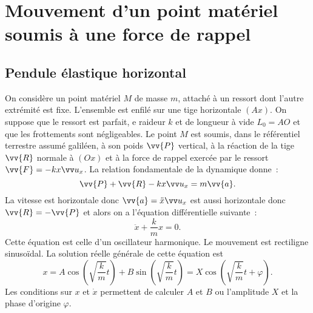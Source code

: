 \section{Mouvement d'un point matériel soumis à une force de rappel}
\label{chap3-sec:mouvementdunpointmaterielsoumisauneforcederappel}
\subsection{Pendule élastique horizontal}
\label{chap3-subsec:pendulehorizontal}
On considère un point matériel $M$ de masse $m$, attaché à un ressort dont l'autre extrémité est fixe. L'ensemble est enfilé sur une tige horizontale $(Ax)$. On suppose que le ressort est parfait, e raideur $k$ et de longueur à vide $L_0=AO$ et que les frottements sont négligeables. Le point $M$ est soumis, dans le référentiel terrestre assumé galiléen, à son poids $\vv{P}$ vertical, à la réaction de la tige $\vv{R}$ normale à $(Ox)$ et à la force de rappel exercée par le ressort $\vv{F}=-kx\ux$. La relation fondamentale de la dynamique donne~:
\begin{equation}
  \vv{P}+\vv{R}-kx\ux = m\vv{a}.
\end{equation}
La vitesse est horizontale donc $\vv{a} = \ddot{x}\ux$ est aussi horizontale donc $\vv{R}=-\vv{P}$ et alors on a l'équation différentielle suivante~:
\begin{equation}
  \ddot{x} +\frac{k}{m}x=0.
\end{equation}
Cette équation est celle d'un oscillateur harmonique. Le mouvement est rectiligne sinusoïdal. La solution réelle générale de cette équation est
\begin{equation}
  x = A \cos\left(\sqrt{\frac{k}{m}} t\right) + B \sin\left(\sqrt{\frac{k}{m}} t\right) = X \cos\left(\sqrt{\frac{k}{m}} t + \varphi\right).
\end{equation}
Les conditions sur $x$ et $\dot{x}$ permettent de calculer $A$ et $B$ ou l'amplitude $X$ et la phase d'origine $\varphi$.

